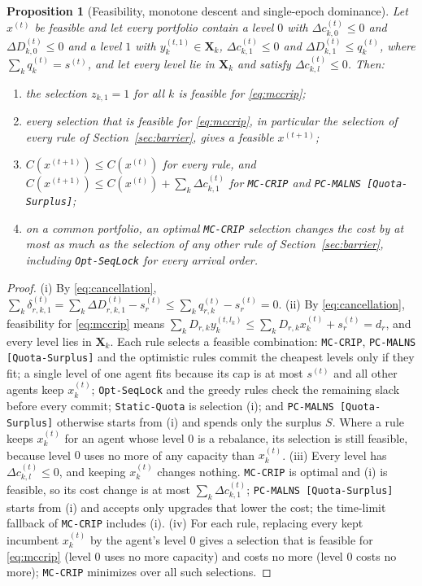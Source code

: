 \documentclass[a4paper,fleqn]{cas-sc}
\newtheorem{proposition}{Proposition}
\newcommand{\mcc}{\texttt{MC-CRIP}}
\newcommand{\pqs}{\texttt{PC-MALNS [Quota-Surplus]}}
\begin{document}
\begin{proposition}[Feasibility, monotone descent and single-epoch dominance]
\label{prop:main}
Let $x^{(t)}$ be feasible and let every portfolio contain a level $0$ with $\Delta c_{k,0}^{(t)} \le 0$ and $\Delta D_{k,0}^{(t)} \le 0$ and a level $1$ with $y_k^{(t,1)} \in \mathbf{X}_k$, $\Delta c_{k,1}^{(t)} \le 0$ and $\Delta D_{k,1}^{(t)} \le q_k^{(t)}$, where $\sum_k q_k^{(t)} = s^{(t)}$, and let every level lie in $\mathbf{X}_k$ and satisfy $\Delta c_{k,l}^{(t)} \le 0$. Then:
\begin{enumerate}[label=(\roman*), noitemsep]
    \item the selection $z_{k,1} = 1$ for all $k$ is feasible for \eqref{eq:mccrip};
    \item every selection that is feasible for \eqref{eq:mccrip}, in particular the selection of every rule of Section~\ref{sec:barrier}, gives a feasible $x^{(t+1)}$;
    \item $C(x^{(t+1)}) \le C(x^{(t)})$ for every rule, and $C(x^{(t+1)}) \le C(x^{(t)}) + \sum_k \Delta c_{k,1}^{(t)}$ for \mcc{} and \pqs;
    \item on a common portfolio, an optimal \mcc{} selection changes the cost by at most as much as the selection of any other rule of Section~\ref{sec:barrier}, including \texttt{Opt-SeqLock} for every arrival order.
\end{enumerate}
\end{proposition}
\begin{proof}
(i) By \eqref{eq:cancellation}, $\sum_k \delta_{r,k,1}^{(t)} = \sum_k \Delta D_{r,k,1}^{(t)} - s_r^{(t)} \le \sum_k q_{r,k}^{(t)} - s_r^{(t)} = 0$. (ii) By \eqref{eq:cancellation}, feasibility for \eqref{eq:mccrip} means $\sum_k D_{r,k} y_k^{(t,l_k)} \le \sum_k D_{r,k} x_k^{(t)} + s_r^{(t)} = d_r$, and every level lies in $\mathbf{X}_k$. Each rule selects a feasible combination: \mcc, \pqs{} and the optimistic rules commit the cheapest levels only if they fit; a single level of one agent fits because its cap is at most $s^{(t)}$ and all other agents keep $x_k^{(t)}$; \texttt{Opt-SeqLock} and the greedy rules check the remaining slack before every commit; \texttt{Static-Quota} is selection (i); and \pqs{} otherwise starts from (i) and spends only the surplus $S$. Where a rule keeps $x_k^{(t)}$ for an agent whose level $0$ is a rebalance, its selection is still feasible, because level $0$ uses no more of any capacity than $x_k^{(t)}$. (iii) Every level has $\Delta c_{k,l}^{(t)} \le 0$, and keeping $x_k^{(t)}$ changes nothing. \mcc{} is optimal and (i) is feasible, so its cost change is at most $\sum_k \Delta c_{k,1}^{(t)}$; \pqs{} starts from (i) and accepts only upgrades that lower the cost; the time-limit fallback of \mcc{} includes (i). (iv) For each rule, replacing every kept incumbent $x_k^{(t)}$ by the agent's level $0$ gives a selection that is feasible for \eqref{eq:mccrip} (level $0$ uses no more capacity) and costs no more (level $0$ costs no more); \mcc{} minimizes over all such selections.
\end{proof}
\end{document}
